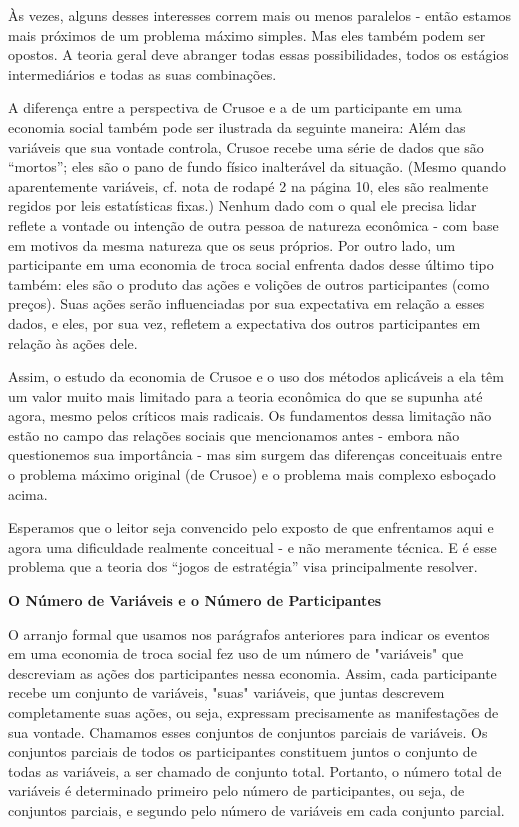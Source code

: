 \documentclass[a4paper,12pt]{article}[abntex2]
\begin{document}
Às vezes, alguns desses interesses correm mais ou menos paralelos - então estamos mais próximos de um problema máximo simples. Mas eles também podem ser opostos. A teoria geral deve abranger todas essas possibilidades, todos os estágios intermediários e todas as suas combinações.

A diferença entre a perspectiva de Crusoe e a de um participante em uma economia social também pode ser ilustrada da seguinte maneira: Além das variáveis que sua vontade controla, Crusoe recebe uma série de dados que são “mortos”; eles são o pano de fundo físico inalterável da situação. (Mesmo quando aparentemente variáveis, cf. nota de rodapé 2 na página 10, eles são realmente regidos por leis estatísticas fixas.) Nenhum dado com o qual ele precisa lidar reflete a vontade ou intenção de outra pessoa de natureza econômica - com base em motivos da mesma natureza que os seus próprios. Por outro lado, um participante em uma economia de troca social enfrenta dados desse último tipo também: eles são o produto das ações e volições de outros participantes (como preços). Suas ações serão influenciadas por sua expectativa em relação a esses dados, e eles, por sua vez, refletem a expectativa dos outros participantes em relação às ações dele.

Assim, o estudo da economia de Crusoe e o uso dos métodos aplicáveis a ela têm um valor muito mais limitado para a teoria econômica do que se supunha até agora, mesmo pelos críticos mais radicais. Os fundamentos dessa limitação não estão no campo das relações sociais que mencionamos antes - embora não questionemos sua importância - mas sim surgem das diferenças conceituais entre o problema máximo original (de Crusoe) e o problema mais complexo esboçado acima.

Esperamos que o leitor seja convencido pelo exposto de que enfrentamos aqui e agora uma dificuldade realmente conceitual - e não meramente técnica. E é esse problema que a teoria dos “jogos de estratégia” visa principalmente resolver.

\textbf{O Número de Variáveis e o Número de Participantes}

O arranjo formal que usamos nos parágrafos anteriores para indicar os eventos em uma economia de troca social fez uso de um número de "variáveis" que descreviam as ações dos participantes nessa economia. Assim, cada participante recebe um conjunto de variáveis, "suas" variáveis, que juntas descrevem completamente suas ações, ou seja, expressam precisamente as manifestações de sua vontade. Chamamos esses conjuntos de conjuntos parciais de variáveis. Os conjuntos parciais de todos os participantes constituem juntos o conjunto de todas as variáveis, a ser chamado de conjunto total. Portanto, o número total de variáveis é determinado primeiro pelo número de participantes, ou seja, de conjuntos parciais, e segundo pelo número de variáveis em cada conjunto parcial.
\end{document}
